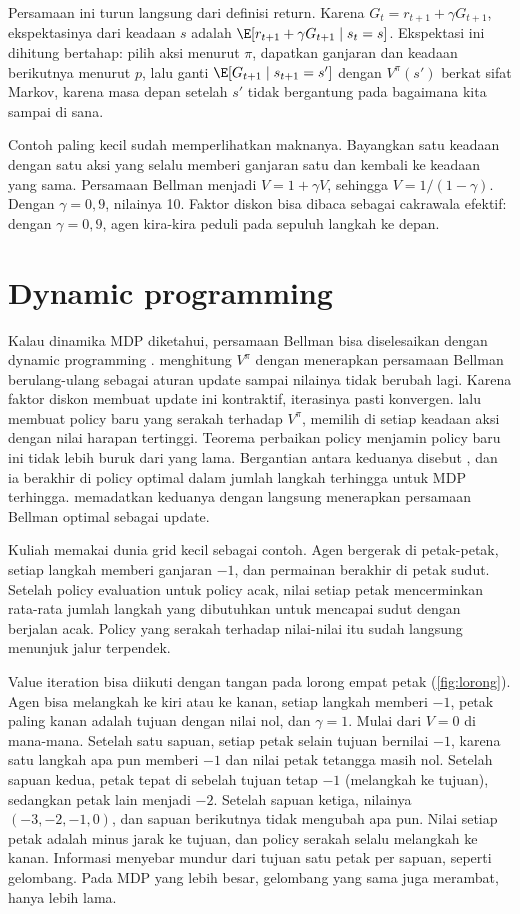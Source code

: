 Persamaan ini turun langsung dari definisi return. Karena $G_t=r_{t+1}+\gamma G_{t+1}$, ekspektasinya
dari keadaan $s$ adalah $\E[r_{t+1}+\gamma G_{t+1}\mid s_t=s]$. Ekspektasi ini dihitung bertahap: pilih
aksi menurut $\pi$, dapatkan ganjaran dan keadaan berikutnya menurut $p$, lalu ganti
$\E[G_{t+1}\mid s_{t+1}=s']$ dengan $V^\pi(s')$ berkat sifat Markov, karena masa depan setelah $s'$ tidak
bergantung pada bagaimana kita sampai di sana.

Contoh paling kecil sudah memperlihatkan maknanya. Bayangkan satu keadaan dengan satu aksi yang
selalu memberi ganjaran satu dan kembali ke keadaan yang sama. Persamaan Bellman menjadi
$V=1+\gamma V$, sehingga $V=1/(1-\gamma)$. Dengan $\gamma=0{,}9$, nilainya 10. Faktor diskon bisa
dibaca sebagai cakrawala efektif: dengan $\gamma=0{,}9$, agen kira-kira peduli pada sepuluh langkah ke
depan.

\section{Dynamic programming}

Kalau dinamika MDP diketahui, persamaan Bellman bisa diselesaikan dengan dynamic programming
\citep{bellman1957}.  menghitung $V^\pi$ dengan menerapkan persamaan Bellman
berulang-ulang sebagai aturan update sampai nilainya tidak berubah lagi. Karena faktor diskon
membuat update ini kontraktif, iterasinya pasti konvergen.  lalu membuat
policy baru yang serakah terhadap $V^\pi$, memilih di setiap keadaan aksi dengan nilai harapan
tertinggi. Teorema perbaikan policy menjamin policy baru ini tidak lebih buruk dari yang lama.
Bergantian antara keduanya disebut , dan ia berakhir di policy optimal
dalam jumlah langkah terhingga untuk MDP terhingga.  memadatkan keduanya
dengan langsung menerapkan persamaan Bellman optimal sebagai update.

Kuliah memakai dunia grid kecil sebagai contoh. Agen bergerak di petak-petak, setiap langkah memberi
ganjaran $-1$, dan permainan berakhir di petak sudut. Setelah policy evaluation untuk policy acak,
nilai setiap petak mencerminkan rata-rata jumlah langkah yang dibutuhkan untuk mencapai sudut
dengan berjalan acak. Policy yang serakah terhadap nilai-nilai itu sudah langsung menunjuk jalur
terpendek.

Value iteration bisa diikuti dengan tangan pada lorong empat petak (\cref{fig:lorong}). Agen bisa melangkah ke kiri atau
ke kanan, setiap langkah memberi $-1$, petak paling kanan adalah tujuan dengan nilai nol, dan $\gamma=1$. Mulai dari
$V=0$ di mana-mana. Setelah satu sapuan, setiap petak selain tujuan bernilai $-1$, karena satu langkah apa pun memberi
$-1$ dan nilai petak tetangga masih nol. Setelah sapuan kedua, petak tepat di sebelah tujuan tetap $-1$ (melangkah ke
tujuan), sedangkan petak lain menjadi $-2$. Setelah sapuan ketiga, nilainya $(-3,-2,-1,0)$, dan sapuan berikutnya tidak
mengubah apa pun. Nilai setiap petak adalah minus jarak ke tujuan, dan policy serakah selalu melangkah ke kanan.
Informasi menyebar mundur dari tujuan satu petak per sapuan, seperti gelombang. Pada MDP yang lebih besar, gelombang
yang sama juga merambat, hanya lebih lama.

